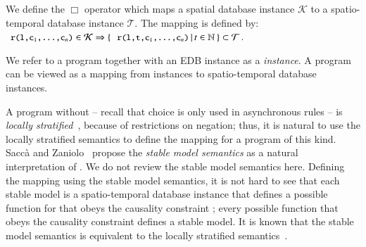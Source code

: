 We define the $\Box$ operator which maps a spatial database instance $\mathcal{K}$ to a spatio-temporal database instance $\mathcal{T}$.  The mapping is defined by: $\dedalus{r(l,c\sub{1},\ldots,c\sub{n})} \in \mathcal{K} \Rightarrow \{ \, \dedalus{r(l,t,c\sub{1},\ldots,c\sub{n})} \, | \, t \in \mathbb{N} \, \} \subset \mathcal{T}$. 

We refer to a \lang program together with an EDB instance as a {\em \lang instance}.  A \lang program can be viewed as a mapping from \lang instances to spatio-temporal database instances.

A \lang program without  -- recall that choice is only used in asynchronous rules -- is {\em locally stratified}~\cite{local-strat}, because of restrictions on negation; thus, it is natural to use the locally stratified semantics to define the mapping for a \lang program of this kind.  Sacc\`{a} and Zaniolo~\cite{sacca-zaniolo} propose the {\em stable model semantics} as a natural interpretation of .  We do not review the stable model semantics here.  Defining the mapping using the stable model semantics, it is not hard to see that each stable model is a spatio-temporal database instance that defines a possible function for  that obeys the causality constraint ; every possible function that obeys the causality constraint defines a stable model.  It is known that the stable model semantics is equivalent to the locally stratified semantics~\cite{stable-model}.  

